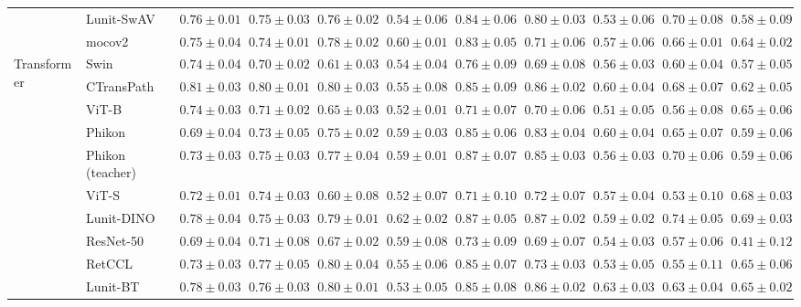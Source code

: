 \begin{tabular}{ll|cccc|c|cccc}
 & Lunit-SwAV & $0.76 \pm 0.01$ & $0.75 \pm 0.03$ & $0.76 \pm 0.02$ & $0.54 \pm 0.06$ & $0.84 \pm 0.06$ & $0.80 \pm 0.03$ & $0.53 \pm 0.06$ & $0.70 \pm 0.08$ & $0.58 \pm 0.09$ \\
 & mocov2 & $0.75 \pm 0.04$ & $0.74 \pm 0.01$ & $0.78 \pm 0.02$ & $0.60 \pm 0.01$ & $0.83 \pm 0.05$ & $0.71 \pm 0.06$ & $0.57 \pm 0.06$ & $0.66 \pm 0.01$ & $0.64 \pm 0.02$ \\
\cline{1-11}
\multirow[t]{12}{*}{Transformer} & Swin & $0.74 \pm 0.04$ & $0.70 \pm 0.02$ & $0.61 \pm 0.03$ & $0.54 \pm 0.04$ & $0.76 \pm 0.09$ & $0.69 \pm 0.08$ & $0.56 \pm 0.03$ & $0.60 \pm 0.04$ & $0.57 \pm 0.05$ \\
 & CTransPath & $\mathbf{0.81 \pm 0.03}$ & $\mathbf{0.80 \pm 0.01}$ & $0.80 \pm 0.03$ & $0.55 \pm 0.08$ & $0.85 \pm 0.09$ & $0.86 \pm 0.02$ & $0.60 \pm 0.04$ & $0.68 \pm 0.07$ & $0.62 \pm 0.05$ \\
 & ViT-B & $0.74 \pm 0.03$ & $0.71 \pm 0.02$ & $0.65 \pm 0.03$ & $0.52 \pm 0.01$ & $0.71 \pm 0.07$ & $0.70 \pm 0.06$ & $0.51 \pm 0.05$ & $0.56 \pm 0.08$ & $0.65 \pm 0.06$ \\
 & Phikon & $0.69 \pm 0.04$ & $0.73 \pm 0.05$ & $0.75 \pm 0.02$ & $0.59 \pm 0.03$ & $0.85 \pm 0.06$ & $0.83 \pm 0.04$ & $0.60 \pm 0.04$ & $0.65 \pm 0.07$ & $0.59 \pm 0.06$ \\
 & Phikon (teacher) & $0.73 \pm 0.03$ & $0.75 \pm 0.03$ & $0.77 \pm 0.04$ & $0.59 \pm 0.01$ & $0.87 \pm 0.07$ & $0.85 \pm 0.03$ & $0.56 \pm 0.03$ & $0.70 \pm 0.06$ & $0.59 \pm 0.06$ \\
 & ViT-S & $0.72 \pm 0.01$ & $0.74 \pm 0.03$ & $0.60 \pm 0.08$ & $0.52 \pm 0.07$ & $0.71 \pm 0.10$ & $0.72 \pm 0.07$ & $0.57 \pm 0.04$ & $0.53 \pm 0.10$ & $0.68 \pm 0.03$ \\
 & Lunit-DINO & $0.78 \pm 0.04$ & $0.75 \pm 0.03$ & $0.79 \pm 0.01$ & $\mathbf{0.62 \pm 0.02}$ & $\mathbf{0.87 \pm 0.05}$ & $\mathbf{0.87 \pm 0.02}$ & $0.59 \pm 0.02$ & $\mathbf{0.74 \pm 0.05}$ & $\mathbf{0.69 \pm 0.03}$ \\
 & ResNet-50 & $0.69 \pm 0.04$ & $0.71 \pm 0.08$ & $0.67 \pm 0.02$ & $0.59 \pm 0.08$ & $0.73 \pm 0.09$ & $0.69 \pm 0.07$ & $0.54 \pm 0.03$ & $0.57 \pm 0.06$ & $0.41 \pm 0.12$ \\
 & RetCCL & $0.73 \pm 0.03$ & $0.77 \pm 0.05$ & $0.80 \pm 0.04$ & $0.55 \pm 0.06$ & $0.85 \pm 0.07$ & $0.73 \pm 0.03$ & $0.53 \pm 0.05$ & $0.55 \pm 0.11$ & $0.65 \pm 0.06$ \\
 & Lunit-BT & $0.78 \pm 0.03$ & $0.76 \pm 0.03$ & $\mathbf{0.80 \pm 0.01}$ & $0.53 \pm 0.05$ & $0.85 \pm 0.08$ & $0.86 \pm 0.02$ & $\mathbf{0.63 \pm 0.03}$ & $0.63 \pm 0.04$ & $0.65 \pm 0.02$ \\

\end{tabular}
